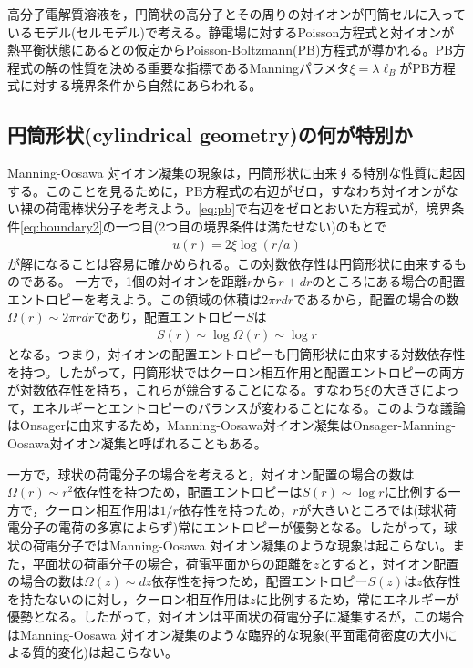 \documentclass[11pt,a4paper]{ltjsarticle}
\theoremstyle{definition}
\theoremstyle{remark}
\begin{document}
\begin{pointbox}
高分子電解質溶液を，円筒状の高分子とその周りの対イオンが円筒セルに入っているモデル(セルモデル)で考える。静電場に対するPoisson方程式と対イオンが熱平衡状態にあるとの仮定からPoisson-Boltzmann(PB)方程式が導かれる。PB方程式の解の性質を決める重要な指標であるManningパラメタ$\xi=\lambda \ell_B$がPB方程式に対する境界条件から自然にあらわれる。
\end{pointbox}

\subsection{円筒形状(cylindrical geometry)の何が特別か\label{sec:cylindrical}}
Manning-Oosawa 対イオン凝集の現象は，円筒形状に由来する特別な性質に起因する。このことを見るために，PB方程式の右辺がゼロ，すなわち対イオンがない裸の荷電棒状分子を考えよう。\eqref{eq:pb}で右辺をゼロとおいた方程式が，境界条件\eqref{eq:boundary2}の一つ目(2つ目の境界条件は満たせない)のもとで
\begin{align}
  u(r)=2\xi \log(r/a) \label{eq:bare_solution}
\end{align}
が解になることは容易に確かめられる。この対数依存性は円筒形状に由来するものである。
一方で，1個の対イオンを距離$r$から$r+dr$のところにある場合の配置エントロピーを考えよう。この領域の体積は$2\pi r dr$であるから，配置の場合の数$\Omega(r)\sim 2\pi r dr$であり，配置エントロピー$S$は
\begin{align}
  S(r)\sim \log \Omega(r)\sim \log r
\end{align}
となる。つまり，対イオンの配置エントロピーも円筒形状に由来する対数依存性を持つ。したがって，円筒形状ではクーロン相互作用と配置エントロピーの両方が対数依存性を持ち，これらが競合することになる。すなわち$\xi$の大きさによって，エネルギーとエントロピーのバランスが変わることになる。このような議論はOnsagerに由来するため\cite{Onsager1934}，Manning-Oosawa対イオン凝集はOnsager-Manning-Oosawa対イオン凝集と呼ばれることもある。

一方で，球状の荷電分子の場合を考えると，対イオン配置の場合の数は$\Omega(r)\sim r^2$依存性を持つため，配置エントロピーは$S(r)\sim \log r$に比例する一方で，クーロン相互作用は$1/r$依存性を持つため，$r$が大きいところでは(球状荷電分子の電荷の多寡によらず)常にエントロピーが優勢となる。したがって，球状の荷電分子ではManning-Oosawa 対イオン凝集のような現象は起こらない。また，平面状の荷電分子の場合，荷電平面からの距離を$z$とすると，対イオン配置の場合の数は$\Omega(z)\sim dz$依存性を持つため，配置エントロピー$S(z)$は$z$依存性を持たないのに対し，クーロン相互作用は$z$に比例するため，常にエネルギーが優勢となる。したがって，対イオンは平面状の荷電分子に凝集するが，この場合はManning-Oosawa 対イオン凝集のような臨界的な現象(平面電荷密度の大小による質的変化)は起こらない。
\end{document}
